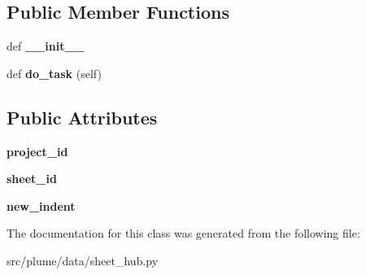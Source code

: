 \subsection*{Public Member Functions}
\begin{DoxyCompactItemize}
\item 
def {\bfseries \+\_\+\+\_\+init\+\_\+\+\_\+}\hypertarget{classplume-creator_1_1src_1_1plume_1_1data_1_1sheet__hub_1_1_set_indent_ae15c40fd087e9cdc1b290897400ec31c}{}\label{classplume-creator_1_1src_1_1plume_1_1data_1_1sheet__hub_1_1_set_indent_ae15c40fd087e9cdc1b290897400ec31c}

\item 
def {\bfseries do\+\_\+task} (self)\hypertarget{classplume-creator_1_1src_1_1plume_1_1data_1_1sheet__hub_1_1_set_indent_a840c0191c02a40b6c31c61e020b45a8c}{}\label{classplume-creator_1_1src_1_1plume_1_1data_1_1sheet__hub_1_1_set_indent_a840c0191c02a40b6c31c61e020b45a8c}

\end{DoxyCompactItemize}
\subsection*{Public Attributes}
\begin{DoxyCompactItemize}
\item 
{\bfseries project\+\_\+id}\hypertarget{classplume-creator_1_1src_1_1plume_1_1data_1_1sheet__hub_1_1_set_indent_a8683ede4f8054bb5ab98f033374dab16}{}\label{classplume-creator_1_1src_1_1plume_1_1data_1_1sheet__hub_1_1_set_indent_a8683ede4f8054bb5ab98f033374dab16}

\item 
{\bfseries sheet\+\_\+id}\hypertarget{classplume-creator_1_1src_1_1plume_1_1data_1_1sheet__hub_1_1_set_indent_aef3093d90ddbfa38230e5c19045e0f7d}{}\label{classplume-creator_1_1src_1_1plume_1_1data_1_1sheet__hub_1_1_set_indent_aef3093d90ddbfa38230e5c19045e0f7d}

\item 
{\bfseries new\+\_\+indent}\hypertarget{classplume-creator_1_1src_1_1plume_1_1data_1_1sheet__hub_1_1_set_indent_a3047df0aaee0db8ad3c50c144287c7c8}{}\label{classplume-creator_1_1src_1_1plume_1_1data_1_1sheet__hub_1_1_set_indent_a3047df0aaee0db8ad3c50c144287c7c8}

\end{DoxyCompactItemize}


The documentation for this class was generated from the following file\+:\begin{DoxyCompactItemize}
\item 
src/plume/data/sheet\+\_\+hub.\+py\end{DoxyCompactItemize}
